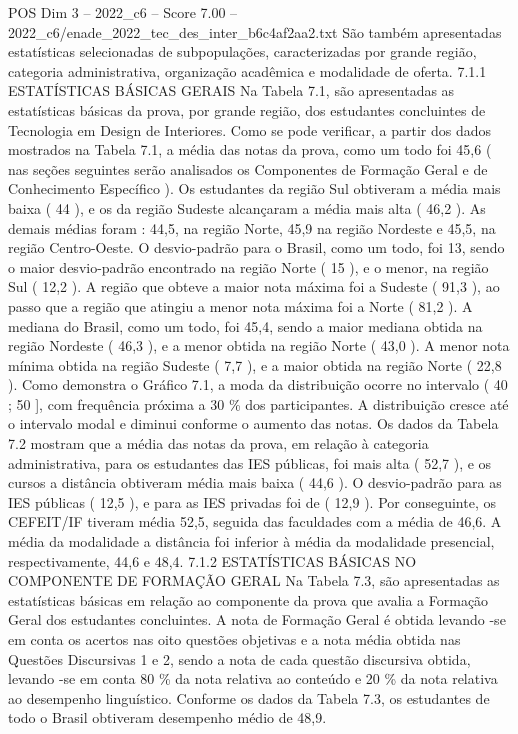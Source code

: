 \begin{textsample}{POS Dim 3 – 2022\_c6 – Score 7.00 – 2022\_c6/enade\_2022\_tec\_des\_inter\_b6c4af2aa2.txt}
São também apresentadas estatísticas selecionadas de subpopulações, caracterizadas por grande região, categoria administrativa, organização acadêmica e modalidade de oferta. 7.1.1 ESTATÍSTICAS BÁSICAS GERAIS Na Tabela 7.1, são apresentadas as estatísticas básicas da prova, por grande região, dos estudantes concluintes de Tecnologia em Design de Interiores.
Como se pode verificar, a partir dos dados mostrados na Tabela 7.1, a média das notas da prova, como um todo foi 45,6 ( nas seções seguintes serão analisados os Componentes de Formação Geral e de Conhecimento Específico ).
Os estudantes da região Sul obtiveram a média mais baixa ( 44 ), e os da região Sudeste alcançaram a média mais alta ( 46,2 ).
As demais médias foram : 44,5, na região Norte, 45,9 na região Nordeste e 45,5, na região Centro-Oeste.
O desvio-padrão para o Brasil, como um todo, foi 13, sendo o maior desvio-padrão encontrado na região Norte ( 15 ), e o menor, na região Sul ( 12,2 ).
A região que obteve a maior nota máxima foi a Sudeste ( 91,3 ), ao passo que a região que atingiu a menor nota máxima foi a Norte ( 81,2 ).
A mediana do Brasil, como um todo, foi 45,4, sendo a maior mediana obtida na região Nordeste ( 46,3 ), e a menor obtida na região Norte ( 43,0 ).
A menor nota mínima obtida na região Sudeste ( 7,7 ), e a maior obtida na região Norte ( 22,8 ).
Como demonstra o Gráfico 7.1, a moda da distribuição ocorre no intervalo ( 40 ; 50 ], com frequência próxima a 30 \% dos participantes.
A distribuição cresce até o intervalo modal e diminui conforme o aumento das notas.
Os dados da Tabela 7.2 mostram que a média das notas da prova, em relação à categoria administrativa, para os estudantes das IES públicas, foi mais alta ( 52,7 ), e os cursos a distância obtiveram média mais baixa ( 44,6 ).
O desvio-padrão para as IES públicas ( 12,5 ), e para as IES privadas foi de ( 12,9 ).
Por conseguinte, os CEFEIT/IF tiveram média 52,5, seguida das faculdades com a média de 46,6.
A média da modalidade a distância foi inferior à média da modalidade presencial, respectivamente, 44,6 e 48,4. 7.1.2 ESTATÍSTICAS BÁSICAS NO COMPONENTE DE FORMAÇÃO GERAL Na Tabela 7.3, são apresentadas as estatísticas básicas em relação ao componente da prova que avalia a Formação Geral dos estudantes concluintes.
A nota de Formação Geral é obtida levando -se em conta os acertos nas oito questões objetivas e a nota média obtida nas Questões Discursivas 1 e 2, sendo a nota de cada questão discursiva obtida, levando -se em conta 80 \% da nota relativa ao conteúdo e 20 \% da nota relativa ao desempenho linguístico.
Conforme os dados da Tabela 7.3, os estudantes de todo o Brasil obtiveram desempenho médio de 48,9.

\end{textsample}
